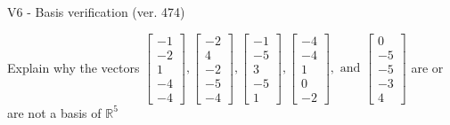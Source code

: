 \begin{exercise}
  \begin{exerciseTitle}V6 - Basis verification (ver. 474)\end{exerciseTitle}
  \begin{exerciseStatement}
    Explain why the vectors \(\left[\begin{array}{r}
-1 \\
-2 \\
1 \\
-4 \\
-4
\end{array}\right] , \left[\begin{array}{r}
-2 \\
4 \\
-2 \\
-5 \\
-4
\end{array}\right] , \left[\begin{array}{r}
-1 \\
-5 \\
3 \\
-5 \\
1
\end{array}\right] , \left[\begin{array}{r}
-4 \\
-4 \\
1 \\
0 \\
-2
\end{array}\right] , \text{ and } \left[\begin{array}{r}
0 \\
-5 \\
-5 \\
-3 \\
4
\end{array}\right]\) are or are not a basis of \(\mathbb{R}^5\)	



\end{exerciseStatement}
\end{exercise}
